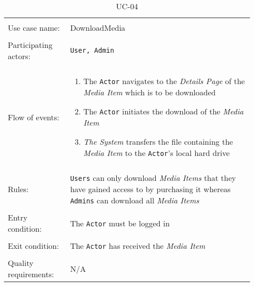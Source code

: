 \noindent
\begin{table}[h!]
\caption{UC-04}
\label{UC-04}
\centering
\begin{tabular}{ l  p{8cm} }   
\hline
\\
Use case name:  & DownloadMedia   \\   \hline    
\\            
Participating actors:  & \texttt{\texttt{User}, \texttt{Admin}} \\   \hline   
\\             
Flow of events: & \begin{enumerate}
\item{The \texttt{Actor} navigates to the \textit{Details Page} of the \textit{Media Item} which is to be downloaded}
\item{The \texttt{Actor} initiates the download of the \textit{Media Item}}
\item{\textit{The System} transfers the file containing the \textit{Media Item} to the \texttt{Actor}'s local hard drive}
\end{enumerate}
\\ \hline
\\
Rules: & \texttt{Users} can only download \textit{Media Items} that they have gained access to by purchasing it whereas \texttt{Admins} can download all \textit{Media Items}
\\   \hline 
\\
Entry condition: & The \texttt{Actor} must be logged in \\ \hline
\\
Exit condition: & The \texttt{Actor} has received the \textit{Media Item} \\ \hline
\\
Quality requirements: & N/A  \\ \hline
\end{tabular}
\end{table}


